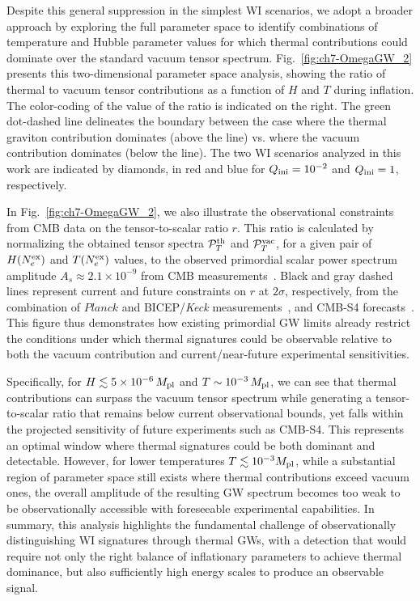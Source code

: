Despite this general suppression in the simplest WI scenarios, we adopt a broader approach by exploring the full parameter space to identify combinations of temperature and Hubble parameter values for which thermal contributions could dominate over the standard vacuum tensor spectrum. Fig.~\ref{fig:ch7-OmegaGW_2} presents this two-dimensional parameter space analysis, showing the ratio of thermal to vacuum tensor contributions as a function of $H$ and $T$ during inflation. The color-coding of the value of the ratio is indicated on the right.  The green dot-dashed line delineates the boundary between the case where the thermal graviton contribution dominates (above the line) vs.
where the vacuum contribution dominates (below the line).  The two WI scenarios analyzed in this work are indicated by diamonds, in red and blue for $Q_{\rm ini} = 10^{-2}$ and $Q_{\rm ini}= 1$, respectively.

In Fig.~\ref{fig:ch7-OmegaGW_2}, we also illustrate the observational constraints from CMB data on the tensor-to-scalar ratio $r$.
This ratio is calculated by normalizing the obtained tensor spectra $\mathcal{P}_T^{\rm th}$ and $\mathcal{P}_T^{\rm vac}$, for a given pair of $H(N_e^{\rm ex})$ and $T(N_e^{\rm ex})$ values, to the observed primordial scalar power spectrum amplitude $A_s\approx 2.1\times 10^{-9}$ from CMB measurements~\cite{Planck:2018vyg}.
Black and gray dashed lines represent current and future constraints on $r$ at $2\sigma$, respectively, from the combination of $\textit{Planck}$ and BICEP/\textit{Keck} measurements~\cite{BICEP:2021xfz}, and CMB-S4 forecasts~\cite{CMB-S4:2020lpa}. This figure thus demonstrates how existing primordial GW limits already restrict the conditions under which thermal signatures could be observable relative to both the vacuum contribution and current/near-future experimental sensitivities.

Specifically, for $H\lesssim 5\times10^{-6}\,M_{\rm pl}$ and $T\sim 10^{-3}\,M_{\rm pl}$, we can see that thermal contributions can surpass the vacuum tensor spectrum while generating a tensor-to-scalar ratio that remains below current observational bounds, yet falls within the projected sensitivity of future experiments such as CMB-S4. This represents an optimal window where thermal signatures could be both dominant and detectable. However, for lower temperatures $T \lesssim 10^{-3} M_{\rm pl}$, while a substantial region of parameter space still exists where thermal contributions exceed vacuum ones, the overall amplitude of the resulting GW spectrum becomes too weak to be observationally accessible with foreseeable experimental capabilities. In summary, this analysis highlights the fundamental challenge of observationally distinguishing WI signatures through thermal GWs, with a detection that would require not only the right balance of inflationary parameters to achieve thermal dominance, but also sufficiently high energy scales to produce an observable signal.



